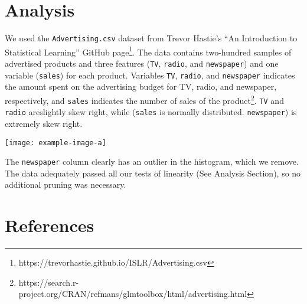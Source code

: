 \documentclass{article}
\begin{document}
\section{Analysis}
We used the \texttt{Advertising.csv} dataset from Trevor Hastie’s “An Introduction to Statistical Learning”  GitHub page\footnote{https://trevorhastie.github.io/ISLR/Advertising.csv}. The data contains two-hundred samples of advertised products and three features (\texttt{TV}, \texttt{radio}, and \texttt{newspaper}) and one variable (\texttt{sales}) for each product. Variables \texttt{TV}, \texttt{radio}, and \texttt{newspaper} indicates the amount spent on the advertising budget for TV, radio, and newspaper, respectively, and \texttt{sales} indicates the number of sales of the product\footnote{https://search.r-project.org/CRAN/refmans/glmtoolbox/html/advertising.html}. \texttt{TV} and \texttt{radio} areslightly skew right, while (\texttt{sales} is normally distributed.   \texttt{newspaper}) is extremely skew right.

\texttt{[image: example-image-a]}


The \texttt{newspaper} column clearly has an outlier in the histogram, which we remove.  The data adequately passed all our tests of linearity (See Analysis Section), so no additional pruning was necessary.


\section{References}
\end{document}
